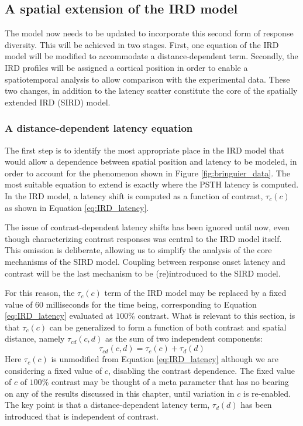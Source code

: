 \documentclass[phd,ianc,twoside]{infthesis}
\begin{document}
\subsection{A spatial extension of the IRD model}
\label{section:spatial_extension_SIRD}

The model now needs to be updated to incorporate this second form of
response diversity. This will be achieved in two stages. First, one
equation of the IRD model will be modified to accommodate a
distance-dependent term. Secondly, the IRD profiles will be assigned a
cortical position in order to enable a spatiotemporal analysis to allow
comparison with the experimental data. These two changes, in addition to
the latency scatter constitute the core of the spatially extended IRD
(SIRD) model.

\subsubsection*{A distance-dependent latency equation}
\label{section:distance_dependent_extension}

The first step is to identify the most appropriate place in the IRD
model that would allow a dependence between spatial position and latency
to be modeled, in order to account for the phenomenon shown in Figure
\ref{fig:bringuier_data}. The most suitable equation to extend is
exactly where the PSTH latency is computed. In the IRD model, a latency
shift is computed as a function of contrast, $\tau_c(c)$ as shown in
Equation \ref{eq:IRD_latency}.

The issue of contrast-dependent latency shifts has been ignored until
now, even though characterizing contrast responses was central to the
IRD model itself. This omission is
deliberate, allowing us to simplify the analysis of the core mechanisms of the
SIRD model. Coupling between response onset latency and contrast will be
the last mechanism to be (re)introduced to the SIRD model.

For this reason, the $\tau_c(c)$ term of the IRD model may be replaced
by a fixed value of $60$ milliseconds for the time being, corresponding
to Equation \ref{eq:IRD_latency} evaluated at $100\%$ contrast. What is
relevant to this section, is that $\tau_c(c)$ can be generalized to form
a function of both contrast and spatial distance, namely
$\tau_{cd}(c,d)$ as the sum of two independent components:
\begin{equation}
\label{eq:IRD_latency_cd}
\tau_{cd}(c,d) = \tau_c(c) + \tau_d(d)
\end{equation}
Here $\tau_c(c)$ is unmodified from Equation \ref{eq:IRD_latency}
although we are considering a fixed value of $c$, disabling the
contrast dependence. The fixed value of $c$ of $100\%$ contrast may be
thought of a meta parameter that has no bearing on any of the results
discussed in this chapter, until variation in $c$ is re-enabled. The key
point is that a distance-dependent latency term, $\tau_d(d)$ has been
introduced that is independent of contrast.
\end{document}
